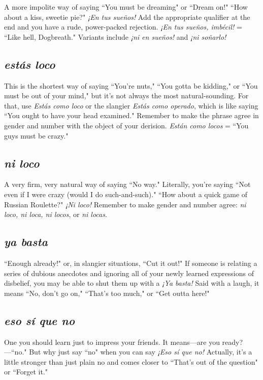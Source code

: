 A more impolite way of saying ``You must be dreaming" or
``Dream on!" ``How about a kiss, sweetie pie?" \emph{¡En tus sueños!} Add the
appropriate qualifier at the end and you have a rude, power-packed rejection. \emph{¡En tus sueños, imbécil!} = ``Like hell, Dogbreath." Variants
include \emph{¡ni en sueños!} and \emph{¡ni soñarlo!}

\subsection{\emph{estás loco}}

This is the shortest way of saying ``You're nuts," ``You gotta be
kidding," or ``You must be out of your mind," but it's not always the
most natural-sounding. For that, use \emph{Estás como loco} or the slangier
\emph{Estás como operado}, which is like saying ``You ought to have your
head examined." Remember to make the phrase agree in gender and
number with the object of your derision. \emph{Están como locos} = ``You
guys must be crazy."

\subsection{\emph{ni loco}}

A very firm, very natural way of saying ``No way." Literally,
you're saying ``Not even if I were crazy (would I do such-and-such)."
``How about a quick game of Russian Roulette?" \emph{¡Ni loco!} Remember to make gender and number agree: \emph{ni loco, ni loca, ni locos}, or
\emph{ni locas}.

\subsection{\emph{ya basta}}

``Enough already!" or, in slangier situations, ``Cut it out!" If
someone is relating a series of dubious anecdotes and ignoring all of
your newly learned expressions of disbelief, you may be able to shut
them up with a \emph{¡Ya basta!} Said with a laugh, it means ``No, don't go
on," ``That's too much," or ``Get outta here!"

\subsection{\emph{eso sí que no}}

One you should learn just to impress your friends. It means---are you ready?---``no." But why just say ``no" when you can say \emph{¡Eso sí
	que no!} Actually, it's a little stronger than just plain no and comes
closer to ``That's out of the question" or ``Forget it."

